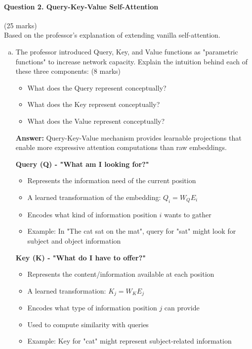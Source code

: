 \documentclass[12pt]{article}
\newcommand{\answer}[1]{{\color{answercolor}\textbf{Answer:} #1}}
\newcommand{\explanation}[1]{{\color{explanationcolor}#1}}
\begin{document}
\newpage
\paragraph{Question 2. Query-Key-Value Self-Attention}\hfill (25 marks)\\
Based on the professor's explanation of extending vanilla self-attention.

\begin{enumerate}[(a)]
    \item The professor introduced Query, Key, and Value functions as "parametric functions" to increase network capacity. Explain the intuition behind each of these three components: \hfill (8 marks)
    \begin{itemize}
        \item What does the Query represent conceptually?
        \item What does the Key represent conceptually?
        \item What does the Value represent conceptually?
    \end{itemize}
    
    \answer{Query-Key-Value mechanism provides learnable projections that enable more expressive attention computations than raw embeddings.}
    
    \explanation{
    \textbf{Query (Q) - "What am I looking for?"}
    \begin{itemize}
        \item Represents the information need of the current position
        \item A learned transformation of the embedding: $Q_i = W_Q E_i$
        \item Encodes what kind of information position $i$ wants to gather
        \item Example: In "The cat sat on the mat", query for "sat" might look for subject and object information
    \end{itemize}
    
    \textbf{Key (K) - "What do I have to offer?"}
    \begin{itemize}
        \item Represents the content/information available at each position
        \item A learned transformation: $K_j = W_K E_j$
        \item Encodes what type of information position $j$ can provide
        \item Used to compute similarity with queries
        \item Example: Key for "cat" might represent subject-related information
    \end{itemize}
    
}
\end{enumerate}
\end{document}
